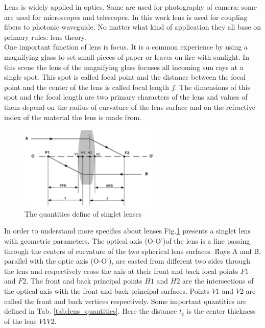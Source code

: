 Lens is widely applied in optics. Some are used for photography of camera; some are used for microscopes and telescopes.  In this work lens is used for coupling fibers to photonic waveguide. No matter what kind of application they all base on primary rules: lens theory.\\
One important function of lens is focus. It is a common experience by using a magnifying glass to set small pieces of paper or leaves on fire with sunlight. In this scene the lens of the magnifying glass focuses all incoming sun rays at a single spot. This spot is called focal point and the distance between the focal point and the center of the lens is called focal length $f$. The dimensions of this spot and the focal length are two primary characters of the lens and values of them depend on the radius of curvature of the lens surface and on the refractive index of the material the lens is made from. \\
\begin{figure}[httbp]
\centering
\includegraphics[width=0.6\textwidth]{bilder/lens_define}
\caption{The quantities define of singlet lenses \cite{lens_theory_LC_Ltd}}
\label{fig:lens_define}
\end{figure}
In order to understand more specifics about lenses Fig.\ref{fig:lens_define}  presents a singlet lens with geometric parameters. \"The optical axis (O-O')of the lens is a line passing through the centers of curvature of the two spherical lens surfaces. \"
Rays A and B, parallel with the optic axis (O-O'), are casted from different two sides through the lens and respectively cross the axis at their front and back focal points $F1$ and $F2$. The front and back principal points $H1$ and $H2$ are the intersections of the optical axis with the front and back principal surfaces. Points $V1$ and $V2$ are called the front and back vertices respectively\cite{lens_theory_LC_Ltd}.  Some important quantities are defined in Tab. \ref{tab:lens_quantities}. Here the distance $t_{c}$ is the center thickness of the lens $V1V2$.\\
